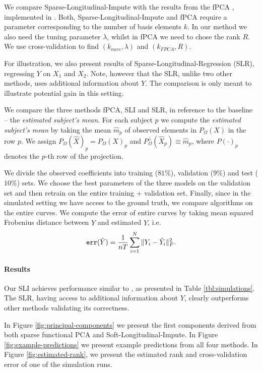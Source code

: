 \documentclass[preprint]{imsart}
\numberwithin{equation}{section}
\theoremstyle{plain}
\begin{document}
We compare Sparse-Longitudinal-Impute with the results from the fPCA \citep{james2000principal}, implemented in \citet{peng2009geometric}. Both, Sparse-Longitudinal-Impute and fPCA require a parameter corresponding to the number of basis elements $k$. In our method we also need the tuning parameter $\lambda$, whilst in fPCA we need to chose the rank $R$. We use cross-validation to find $(k_{ours},\lambda)$ and $(k_{FPCA},R)$.

For illustration, we also present results of Sparse-Longitudinal-Regression (SLR), regressing $Y$ on $X_1$ and $X_2$. Note, however that the SLR, unlike two other methods, uses additional information about $Y$. The comparison is only meant to illustrate potential gain in this setting.

We compare the three methods fPCA, SLI and SLR, in reference to the baseline -- the {\it estimated subject's mean}. For each subject $p$ we compute the {\it estimated subject's mean} by taking the mean $\hat{m}_p$ of observed elements in $P_\Omega(X)$ in the row $p$. We assign $P_\Omega(\hat{X})_p = P_\Omega(X)_p$ and $P^\perp_\Omega (\hat{X}_p) \equiv \hat{m}_p$, where $P(\cdot)_p$ denotes the $p$-th row of the projection.

We divide the observed coefficients into training ($81\%$), validation ($9\%$) and test ($10\%$) sets. We choose the best parameters of the three models on the validation set and then retrain on the entire training + validation set. Finally, since in the simulated setting we have access to the ground truth, we compare algorithms on the entire curves. We compute the error of entire curves by taking mean squared Frobenius distance between $Y$ and estimated $\hat{Y}$, i.e.
\[
 \verb|err|(\hat{Y}) = \frac{1}{nT} \sum_{i=1}^N \|Y_i - \hat{Y}_i \|_F^2.
 \]
 
\paragraph{Results}

Our SLI achieves performance similar to \citep{james2000principal}, as presented in Table \ref{tbl:simulations}. The SLR, having access to additional information about $Y$, clearly outperforms other methods validating its correctness.

In Figure \ref{fig:principal-components} we present the first components derived from both sparse functional PCA and Soft-Longitudinal-Impute. In Figure \ref{fig:example-predictions} we present example predictions from all four methods. In Figure \ref{fig:estimated-rank}, we present the estimated rank and cross-validation error of one of the simulation runs.
\end{document}
